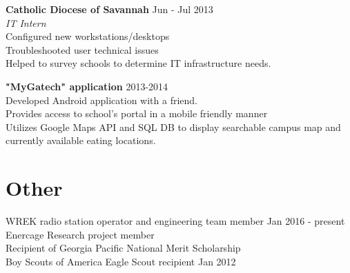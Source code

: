 \documentclass[line, margin]{res}
\begin{document}
\begin{resume}
\textbf{Catholic Diocese of Savannah} \hfill Jun - Jul 2013 \\
\textit{IT Intern} \\
Configured new workstations/desktops \\
Troubleshooted user technical issues \\
Helped to survey schools to determine IT infrastructure needs.

\textbf{"MyGatech" application } \hfill 2013-2014 \\
Developed Android application with a friend. \\
Provides access to school's portal in a mobile friendly manner \\
Utilizes Google Maps API and SQL DB to display searchable campus map and currently available eating locations. \\

\section{Other}
WREK radio station operator and engineering team member \hfill Jan 2016 - present \\
Enercage Research project member\\
Recipient of Georgia Pacific National Merit Scholarship \\
Boy Scouts of America Eagle Scout recipient \hfill Jan 2012 \\

\end{resume}
\end{document}
